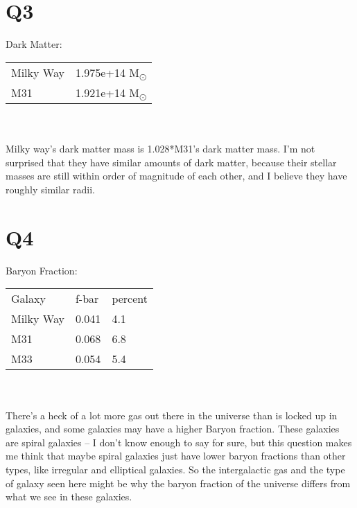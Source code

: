 \documentclass{article}
\begin{document}
\section{Q3}
Dark Matter:
\\
\begin{tabular}{ll}

Milky Way &     1.975e+14 M\textsubscript{\(\odot\)} \\
M31 &     1.921e+14 M\textsubscript{\(\odot\)}

\end{tabular}
\\
\\
Milky way's dark matter mass is 1.028*M31's dark matter mass. I'm not surprised that they have similar amounts of dark matter, because their stellar masses are still within order of magnitude of each other, and I believe they have roughly similar radii.

\section{Q4}
Baryon Fraction:
\\
\begin{tabular}{lll}
Galaxy &     f-bar &    percent \\
Milky Way &     0.041 &    4.1 \\
M31 &     0.068 &     6.8\\
M33 &     0.054 &     5.4

\end{tabular}
\\
\\
There's a heck of a lot more gas out there in the universe than is locked up in galaxies, and some galaxies may have a higher Baryon fraction. These galaxies are spiral galaxies -- I don't know enough to say for sure, but this question makes me think that maybe spiral galaxies just have lower baryon fractions than other types, like irregular and elliptical galaxies. So the intergalactic gas and the type of galaxy seen here might be why the baryon fraction of the universe differs from what we see in these galaxies.
\end{document}
